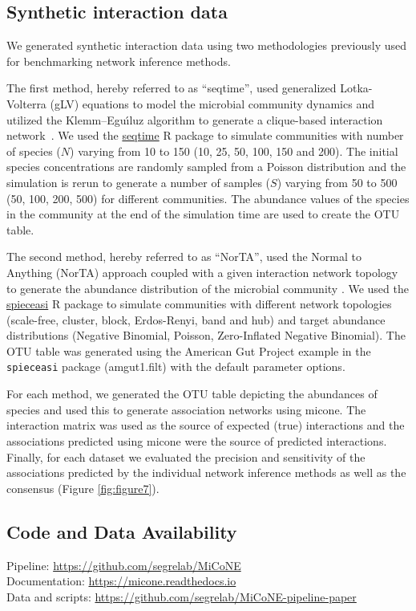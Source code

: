   \subsection*{Synthetic interaction data}
  \vspace{-5mm}

  We generated synthetic interaction data using two methodologies previously used for benchmarking network inference methods.

  The first method, hereby referred to as ``seqtime'', used generalized Lotka-Volterra (gLV) equations to model the microbial community dynamics and utilized the Klemm–Eguı́luz algorithm to generate a clique-based interaction network~\cite{rottjersHairballsHypothesesBiological2018}.
  We used the \href{https://github.com/hallucigenia-sparsa/seqtime}{seqtime} R package to simulate communities with number of species ($N$) varying from 10 to 150 (10, 25, 50, 100, 150 and 200).
  The initial species concentrations are randomly sampled from a Poisson distribution and the simulation is rerun to generate a number of samples ($S$) varying from 50 to 500 (50, 100, 200, 500) for different communities.
  The abundance values of the species in the community at the end of the simulation time are used to create the OTU table.

  The second method, hereby referred to as ``NorTA'', used the Normal to Anything (NorTA) approach coupled with a given interaction network topology to generate the abundance distribution of the microbial community \cite{kurtzSparseCompositionallyRobust2015}.
  We used the \href{https://github.com/zdk123/SpiecEasi}{spieceasi} R package to simulate communities with different network topologies (scale-free, cluster, block, Erdos-Renyi, band and hub) and target abundance distributions (Negative Binomial, Poisson, Zero-Inflated Negative Binomial).
  The OTU table was generated using the American Gut Project example in the \texttt{spieceasi} package (amgut1.filt) with the default parameter options.

  For each method, we generated the OTU table depicting the abundances of species and used this to generate association networks using \ac{micone}.
  The interaction matrix was used as the source of expected (true) interactions and the associations predicted using \ac{micone} were the source of predicted interactions.
  Finally, for each dataset we evaluated the precision and sensitivity of the associations predicted by the individual network inference methods as well as the consensus (Figure \ref{fig:figure7}).

  \subsection*{Code and Data Availability}
  Pipeline: \href{https://github.com/segrelab/MiCoNE}{https://github.com/segrelab/MiCoNE} \\
  Documentation: \href{https://micone.readthedocs.io}{https://micone.readthedocs.io} \\
  Data and scripts: \href{https://github.com/segrelab/MiCoNE-pipeline-paper}{https://github.com/segrelab/MiCoNE-pipeline-paper}
